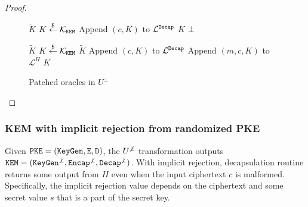 \documentclass{article}
\begin{document}
\begin{proof}
    \begin{figure}[H]
        \begin{minipage}{0.49\textwidth}
            \begin{algorithm}[H]
                \caption{$\mathcal{O}^\decap_1(c)$}\label{alg:u-bot-patched-decap}
                \begin{algorithmic}[1]
                        \State \Return $\tilde{K}$
                    \EndIf
                        \State $K \stackrel{\$}{\leftarrow} \mathcal{K}_\texttt{KEM}$
                        \State Append $(c, K)$ to $\mathcal{L}^\texttt{Decap}$
                        \State \Return $K$
                    \EndIf
                    \State \Return $\bot$
                \end{algorithmic}
            \end{algorithm}
        \end{minipage}
        \hfill
        \begin{minipage}{0.49\textwidth}
            \begin{algorithm}[H]
                \caption{$H_1(m, c)$}\label{alg:u-bot-patched-hash}
                \begin{algorithmic}[1]
                        \State \Return $\tilde{K}$
                    \EndIf
                    \State $K \stackrel{\$}{\leftarrow} \mathcal{K}_\texttt{KEM}$
                            \State \Return $\tilde{K}$
                        \Else
                            \State Append $(c, K)$ to $\mathcal{L}^\texttt{Decap}$
                        \EndIf
                    \EndIf
                    \State Append $(m, c, K)$ to $\mathcal{L}^H$
                    \State \Return $K$
                \end{algorithmic}
            \end{algorithm}
        \end{minipage}
        \caption{Patched oracles in $U^\bot$}\label{fig:u-bot-patched-oracles}
    \end{figure}
\end{proof}

\subsubsection{KEM with implicit rejection from randomized PKE}
Given $\texttt{PKE} = (\texttt{KeyGen}, \texttt{E}, \texttt{D})$, the $U^{\not\bot}$ transformation outputs $\texttt{KEM} = (\texttt{KeyGen}^{\not\bot}, \texttt{Encap}^{\not\bot}, \texttt{Decap}^{\not\bot})$. With implicit rejection, decapsulation routine returns some output from $H$ even when the input ciphertext $c$ is malformed. Specifically, the implicit rejection value depends on the ciphertext and some secret value $s$ that is a part of the secret key.
\end{document}
